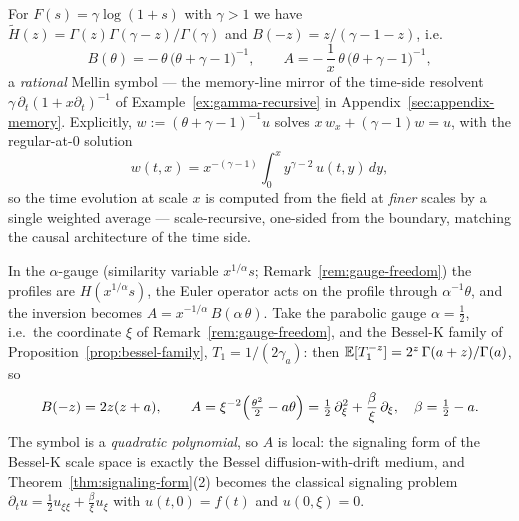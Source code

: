 \begin{example}\label{ex:gamma-signaling}
For $F(s) = \gamma \log(1+s)$ with $\gamma > 1$ we have
$\tilde H(z) = \Gamma(z)\Gamma(\gamma - z)/\Gamma(\gamma)$ and $B(-z) = z/(\gamma - 1 - z)$,
i.e.
\[
  B(\theta) = -\,\theta\,\bigl(\theta + \gamma - 1\bigr)^{-1},
  \qquad A = -\,\frac{1}{x}\,\theta\,\bigl(\theta + \gamma - 1\bigr)^{-1},
\]
a \emph{rational} Mellin symbol --- the memory-line mirror of the time-side resolvent
$\gamma\,\partial_t(1 + x\partial_t)^{-1}$ of Example~\ref{ex:gamma-recursive} in
Appendix~\ref{sec:appendix-memory}. Explicitly,
$w := (\theta + \gamma - 1)^{-1} u$ solves $x\,w_x + (\gamma-1)w = u$, with the regular-at-$0$
solution
\[
  w(t, x) = x^{-(\gamma-1)}\int_0^x y^{\gamma - 2}\, u(t, y)\,dy,
\]
so the time evolution at scale $x$ is computed from the field at \emph{finer} scales by a
single weighted average --- scale-recursive, one-sided from the boundary, matching the causal
architecture of the time side.
\end{example}

\begin{example}\label{ex:bessel-quadratic}
In the $\alpha$-gauge (similarity variable $x^{1/\alpha} s$; Remark~\ref{rem:gauge-freedom})
the profiles are $H(x^{1/\alpha}s)$, the Euler operator acts on the profile through
$\alpha^{-1}\theta$, and the inversion becomes $A = x^{-1/\alpha}\,B(\alpha\,\theta)$. Take the
parabolic gauge $\alpha = \tfrac12$, i.e.\ the coordinate $\xi$ of Remark~\ref{rem:gauge-freedom},
and the Bessel-K family of Proposition~\ref{prop:bessel-family}, $T_1 = 1/(2\gamma_a)$: then
$\mathbb{E}[T_1^{-z}] = 2^z\,\Gamma(a + z)/\Gamma(a)$, so
\[
  B(-z) = 2z(z + a), \qquad
  A = \xi^{-2}\Bigl(\tfrac{\theta^2}{2} - a\theta\Bigr)
  = \tfrac12\,\partial_\xi^2 + \frac{\beta}{\xi}\,\partial_\xi, \quad \beta = \tfrac12 - a .
\]
The symbol is a \emph{quadratic polynomial}, so $A$ is local: the signaling form of the
Bessel-K scale space is exactly the Bessel diffusion-with-drift medium, and
Theorem~\ref{thm:signaling-form}(2) becomes the classical signaling problem
$\partial_t u = \tfrac12 u_{\xi\xi} + \tfrac{\beta}{\xi}u_\xi$ with $u(t,0) = f(t)$ and
$u(0,\xi) = 0$.
\end{example}

